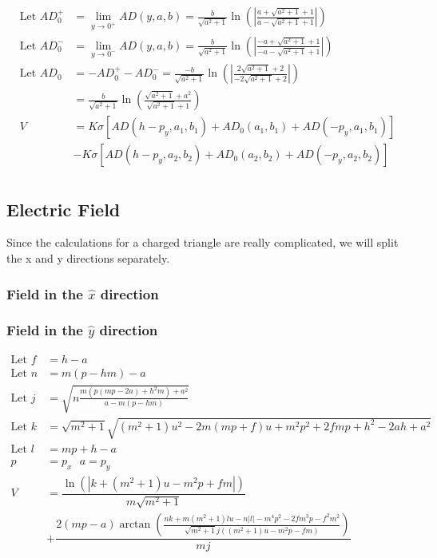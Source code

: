 \documentclass{article}
\begin{document}
\begin{align*}
\text{Let } AD_0^+ &= \lim_{y\to0^+} AD(y,a,b) = \frac{b}{\sqrt{a^2+1}}\ln\left(\left|\frac{a+\sqrt{a^2+1}+1}{a-\sqrt{a^2+1}+1}\right|\right)\\
\text{Let } AD_0^- &= \lim_{y\to0^-
} AD(y,a,b) = \frac{b}{\sqrt{a^2+1}}\ln\left(\left|\frac{-a+\sqrt{a^2+1}+1}{-a-\sqrt{a^2+1}+1}\right|\right)\\
\text{Let } AD_0 &= -AD_0^+-AD_0^- = \frac{-b}{\sqrt{a^2+1}}\ln\left(\left|\frac{2\sqrt{a^2+1}+2}{-2\sqrt{a^2+1}+2}\right|\right)\\
&= \frac{b}{\sqrt{a^2+1}}\ln\left(\frac{\sqrt{a^2+1}+a^2}{\sqrt{a^2+1}+1}\right)\\
V &= K\sigma\left[AD(h-p_y,a_1,b_1)+AD_0(a_1,b_1)+AD(-p_y,a_1,b_1)\right]\\
&- K\sigma\left[AD(h-p_y,a_2,b_2)+AD_0(a_2,b_2)+AD(-p_y,a_2,b_2)\right]\\
\end{align*}

\subsection{Electric Field}
Since the calculations for a charged triangle are really complicated, we will split the x and y directions separately.
\subsubsection{Field in the $\hat{x}$ direction}
\subsubsection{Field in the $\hat{y}$ direction}

\begin{align*}
\text{Let } f &= h-a\\
\text{Let } n &= m\left(p-hm\right)-a\\
\text{Let } j &= \sqrt{n\frac{m\left(p\left(mp-2a\right)+h^2m\right)+a^2}{a-m\left(p-hm\right)}}\\
\text{Let } k &= \sqrt{m^2+1}\sqrt{\left(m^2+1\right)u^2-2m\left(mp+f\right)u+m^2p^2+2fmp+h^2-2ah+a^2}\\
\text{Let } l &= mp+h-a\\
p &= p_x\ \ \ a = p_y\\
V &= \dfrac{\ln\left(\left|k+\left(m^2+1\right)u-m^2p+fm\right|\right)}{m\sqrt{m^2+1}}\\
&+\dfrac{2\left(mp-a\right)\arctan\left(\frac{nk+m\left(m^2+1\right)lu-n\left|l\right|-m^4p^2-2fm^3p-f^2m^2}{\sqrt{m^2+1}j\left(\left(m^2+1\right)u-m^2p-fm\right)}\right)}{mj}
\end{align*}
\end{document}
